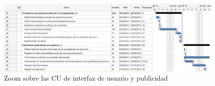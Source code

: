 \begin{landscape}
\begin{figure}[H]
\centering
\includegraphics[scale=\escaladefault]{graficos/gantt/subgantt3.png}
\caption{Zoom sobre las CU de interfaz de usuario y publicidad}
\end{figure}

\end{landscape}